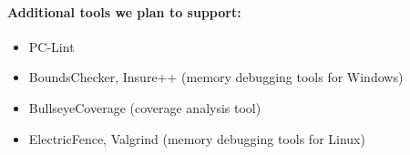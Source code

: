\documentclass[a4paper]{article}
\begin{document}
\paragraph{Additional tools we plan to support:}
\begin{itemize}
  \item PC-Lint
  \item BoundsChecker, Insure++ (memory debugging tools for Windows)
  \item BullseyeCoverage (coverage analysis tool)
  \item ElectricFence, Valgrind (memory debugging tools for Linux)
\end{itemize}

\end{document}
